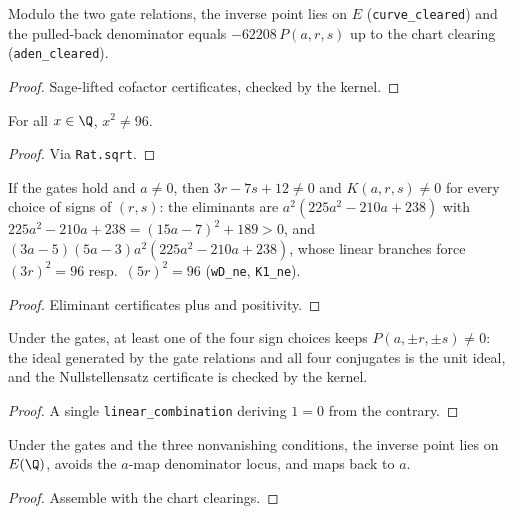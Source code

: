 \begin{lemma}\label{lem:inversecleared}
\leanok
{}
Modulo the two gate relations, the inverse point lies on $E$
(\texttt{curve\_cleared}) and the pulled-back denominator equals
$-62208\,P(a,r,s)$ up to the chart clearing (\texttt{aden\_cleared}).
\end{lemma}
\begin{proof}\leanok
Sage-lifted cofactor certificates, checked by the kernel.
\end{proof}

\begin{lemma}\label{lem:sq96}
\leanok
For all $x \in \Q$, $x^2 \neq 96$.
\end{lemma}
\begin{proof}\leanok
Via \texttt{Rat.sqrt}.
\end{proof}

\begin{lemma}\label{lem:denoms}
\leanok
{}
If the gates hold and $a \neq 0$, then $3r-7s+12 \neq 0$ and
$K(a,r,s) \neq 0$ for every choice of signs of $(r,s)$: the eliminants
are $a^2(225a^2-210a+238)$ with $225a^2-210a+238 = (15a-7)^2+189 > 0$,
and $(3a-5)(5a-3)a^2(225a^2-210a+238)$, whose linear branches force
$(3r)^2 = 96$ resp.\ $(5r)^2 = 96$
(\texttt{wD\_ne}, \texttt{K1\_ne}).
\end{lemma}
\begin{proof}\leanok
Eliminant certificates plus  and positivity.
\end{proof}

\begin{lemma}\label{lem:cover}
\leanok
{}
Under the gates, at least one of the four sign choices keeps
$P(a,\pm r,\pm s) \neq 0$: the ideal generated by the gate relations and
all four conjugates is the unit ideal, and the Nullstellensatz
certificate is checked by the kernel.
\end{lemma}
\begin{proof}\leanok
A single \texttt{linear\_combination} deriving $1 = 0$ from the contrary.
\end{proof}

\begin{lemma}\label{lem:core}
\leanok
{}
Under the gates and the three nonvanishing conditions, the inverse point
lies on $E(\Q)$, avoids the $a$-map denominator locus, and maps back to
$a$.
\end{lemma}
\begin{proof}\leanok
Assemble  with the chart clearings.
\end{proof}

